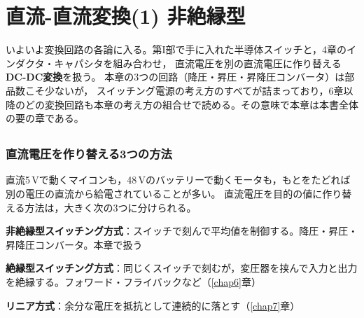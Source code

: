 \chapter{直流-直流変換(1) 非絶縁型}
\label{chap5}

いよいよ変換回路の各論に入る。第I部で手に入れた半導体スイッチと，4章のインダクタ・キャパシタを組み合わせ，
直流電圧を別の直流電圧に作り替える\textbf{DC-DC変換}を扱う。
本章の3つの回路（降圧・昇圧・昇降圧コンバータ）は部品数こそ少ないが，
スイッチング電源の考え方のすべてが詰まっており，6章以降のどの変換回路も本章の考え方の組合せで読める。その意味で本章は本書全体の要の章である。

\section{}
\label{sec5.1}

\subsection{直流電圧を作り替える3つの方法}

直流5\,Vで動くマイコンも，48\,Vのバッテリーで動くモータも，もとをたどれば別の電圧の直流から給電されていることが多い。
直流電圧を目的の値に作り替える方法は，大きく次の3つに分けられる。

\begin{箇条書}
\item {}\textbf{非絶縁型スイッチング方式}：スイッチで刻んで平均値を制御する。降圧・昇圧・昇降圧コンバータ。本章で扱う
\item \textbf{絶縁型スイッチング方式}：同じくスイッチで刻むが，変圧器を挟んで入力と出力を絶縁する。フォワード・フライバックなど（\ref{chap6}章）
\item \textbf{リニア方式}：余分な電圧を抵抗として連続的に落とす（\ref{chap7}章）
\end{箇条書}

